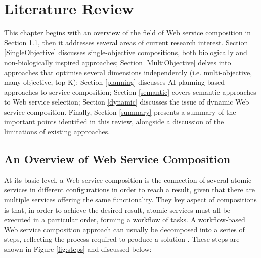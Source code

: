 \chapter{Literature Review}\label{C:review}

This chapter begins with an overview of the field of Web service composition in Section \ref{overview}, then it addresses several areas of current research interest. Section \ref{SingleObjective} discusses single-objective compositions, both biologically and non-biologically inspired approaches; Section \ref{MultiObjective} delves into approaches that optimise several dimensions independently (i.e. multi-objective, many-objective, top-K); Section \ref{planning} discusses AI planning-based approaches to service composition; Section \ref{semantic} covers semantic approaches to Web service selection; Section \ref{dynamic} discusses the issue of dynamic Web service composition. Finally, Section \ref{summary} presents a summary of the important points identified in this review, alongside a discussion of the limitations of existing approaches.

\section{An Overview of Web Service Composition}\label{overview}

At its basic level, a Web service composition is the connection of several atomic services in different configurations in order to reach a result, given that there are multiple services offering the same functionality. They key aspect of compositions is that, in order to achieve the desired result, atomic services must all be executed in a particular order, forming a workflow of tasks. A workflow-based Web service composition approach can usually be decomposed into a series of steps, reflecting the process required to produce a solution \cite{moghaddam2014service}. These steps are shown in Figure \ref{fig:steps} and discussed below:

